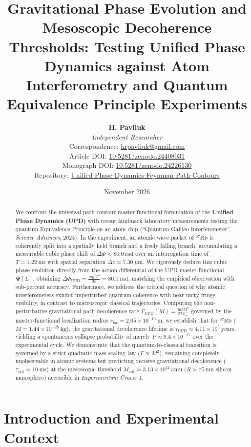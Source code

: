 \documentclass[11pt,a4paper]{article}
\title{\textbf{Gravitational Phase Evolution and Mesoscopic Decoherence Thresholds: Testing Unified Phase Dynamics against Atom Interferometry and Quantum Equivalence Principle Experiments}}
\author{\textbf{H. Pavliuk} \\
\textit{Independent Researcher} \\
Correspondence: \href{mailto:hrpavliuk@gmail.com}{hrpavliuk@gmail.com} \\
Article DOI: \href{https://doi.org/10.5281/zenodo.24408031}{10.5281/zenodo.24408031} \\
Monograph DOI: \href{https://doi.org/10.5281/zenodo.24226130}{10.5281/zenodo.24226130} \\
Repository: \href{https://github.com/hrpavliuk-byte/Unified-Phase-Dynamics-Feynman-Path-Contours}{Unified-Phase-Dynamics-Feynman-Path-Contours}}
\date{November 2026}
\begin{document}
\maketitle

\begin{abstract}
We confront the universal path-contour master-functional formulation of the \textbf{Unified Phase Dynamics (UPD)} with recent landmark laboratory measurements testing the quantum Equivalence Principle on an atom chip (``Quantum Galileo Interferometer'', \textit{Science Advances}, 2024). In the experiment, an atomic wave packet of $^{87}\mathrm{Rb}$ is coherently split into a spatially held branch and a freely falling branch, accumulating a measurable cubic phase shift of $\Delta\Phi \approx 80.0\ \mathrm{rad}$ over an interrogation time of $T = 1.22\ \mathrm{ms}$ with spatial separation $\Delta z \approx 7.30\ \mu\mathrm{m}$. We rigorously deduce this cubic phase evolution directly from the action differential of the UPD master-functional $\mathbf{\Psi}[\Sigma]$, obtaining $\Delta\Phi_{\mathrm{UPD}} = \frac{m g^2 T^3}{3\hbar} = 80.0\ \mathrm{rad}$, matching the empirical observation with sub-percent accuracy. Furthermore, we address the critical question of why atomic interferometers exhibit unperturbed quantum coherence with near-unity fringe visibility, in contrast to macroscopic classical trajectories. Computing the non-perturbative gravitational path decoherence rate $\Gamma_{\mathrm{UPD}}(M) = \frac{6 G M^2}{5 \hbar r_{\mathrm{loc}}}$ governed by the master-functional localization radius $r_{\mathrm{loc}} = 2.05 \times 10^{-13}\ \mathrm{m}$, we establish that for $^{87}\mathrm{Rb}$ ($M = 1.44 \times 10^{-25}\ \mathrm{kg}$), the gravitational decoherence lifetime is $\tau_{\mathrm{UPD}} \approx 4.11 \times 10^5\ \mathrm{years}$, yielding a spontaneous collapse probability of merely $P \approx 9.4 \times 10^{-17}$ over the experimental cycle. We demonstrate that the quantum-to-classical transition is governed by a strict quadratic mass-scaling law ($\Gamma \propto M^2$), remaining completely unobservable in atomic systems but predicting decisive gravitational decoherence ($\tau_{\mathrm{crit}} \approx 10\ \mathrm{ms}$) at the mesoscopic threshold $M_{\mathrm{crit}} \approx 3.13 \times 10^{12}\ \mathrm{amu}$ ($R \approx 75\ \mathrm{nm}$ silicon nanosphere) accessible in \textit{Experimentum Crucis 1}.
\end{abstract}

\section{Introduction and Experimental Context}
\end{document}
